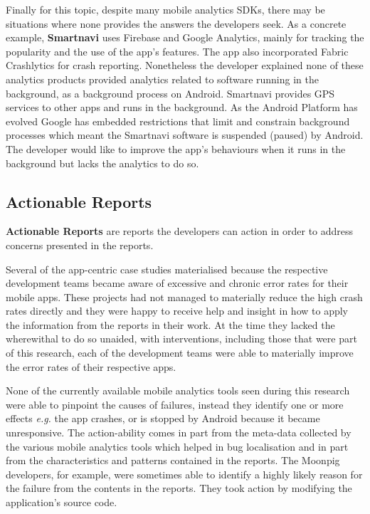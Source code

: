 Finally for this topic, despite many mobile analytics SDKs, there may be situations where none provides the answers the developers seek. As a concrete example, \textbf{Smartnavi} uses Firebase and Google Analytics, mainly for tracking the popularity and the use of the app's features. The app also incorporated Fabric Crashlytics for crash reporting. Nonetheless the developer explained none of these analytics products provided analytics related to software running in the background, as a background process on Android. Smartnavi provides GPS services to other apps and runs in the background. As the Android Platform has evolved Google has embedded restrictions that limit and constrain background processes which meant the Smartnavi software is suspended (paused) by Android. The developer would like to improve the app's behaviours when it runs in the background but lacks the analytics to do so.


\subsection{Actionable Reports}
\textbf{Actionable Reports} are reports the developers can action in order to address concerns presented in the reports. %

Several of the app-centric case studies materialised because the respective development teams became aware of excessive and chronic error rates for their mobile apps. %
These projects had not managed to materially reduce the high crash rates directly and they were happy to receive help and insight in how to apply the information from the reports in their work. At the time they lacked the wherewithal to do so unaided, with interventions, including those that were part of this research, each of the development teams were able to materially improve the error rates of their respective apps.

None of the currently available mobile analytics tools seen during this research were able to pinpoint the causes of failures, instead they identify one or more effects \emph{e.g.} the app crashes, or is stopped by Android because it became unresponsive. The action-ability comes in part from the meta-data collected by the various mobile analytics tools which helped in bug localisation and in part from the characteristics and patterns contained in the reports. The Moonpig developers, for example, were sometimes able to identify a highly likely reason for the failure from the contents in the reports. They took action by modifying the application's source code.

